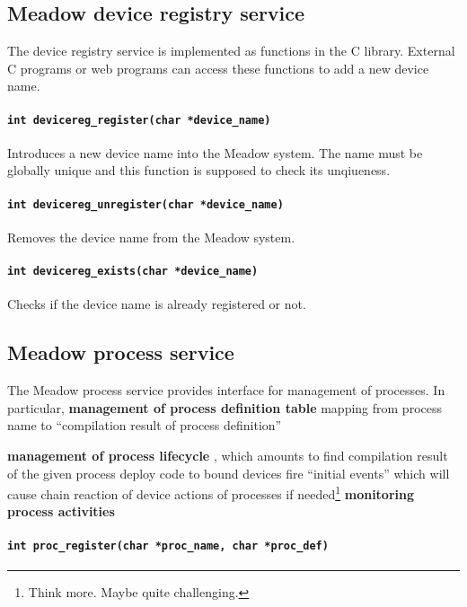 \documentclass{note}
\begin{document}
{\eit

\subsection{Meadow device registry service}
The device registry service is implemented as functions in the C library.
External C programs or web programs can access these functions to add a new
device name. 

\paragraph{\small\textcolor{red2}{\tt{}int devicereg\_register(char *device\_name)}}
  Introduces a new device name into the Meadow system. The name must be
  globally unique and this function is supposed to check its unqiueness.

\paragraph{\small\textcolor{red2}{\tt{}int devicereg\_unregister(char *device\_name)}}
  Removes the device name from the Meadow system.

\paragraph{\small\textcolor{red2}{\tt{}int devicereg\_exists(char
    *device\_name)}} 
  Checks if the device name is already registered or not.


\subsection{Meadow process service}
The Meadow process service provides interface for management of processes.
In particular,
\bit
\w \textcolor{blue2}{\bf{}management of process definition table}
   \bit
   \w mapping from process name to ``compilation result of process
   definition''
   \eit
  
\w \textcolor{blue2}{\bf{}management of process lifecycle}
   \bit
   \w {}, which amounts to
      \bit
      \w find compilation result of the given process 
      \w deploy code to bound devices
      \eit
   \w fire ``initial events'' which will cause chain reaction of device actions
   \w {} of processes if needed\footnote{Think more. Maybe
     quite challenging.}
   \eit
\w \textcolor{blue2}{\bf{}monitoring process activities}
\eit

\paragraph{\small\textcolor{red2}{\tt{}int proc\_register(char *proc\_name, char *proc\_def)}}
}
\end{document}
